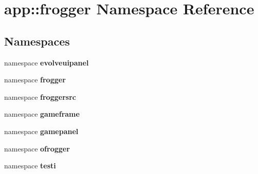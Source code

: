 \section{app::frogger Namespace Reference}
\label{namespaceapp_1_1frogger}


\subsection*{Namespaces}
\begin{CompactItemize}
\item 
namespace {\bf evolveuipanel}
\item 
namespace {\bf frogger}
\item 
namespace {\bf froggersrc}
\item 
namespace {\bf gameframe}
\item 
namespace {\bf gamepanel}
\item 
namespace {\bf ofrogger}
\item 
namespace {\bf testi}
\end{CompactItemize}
